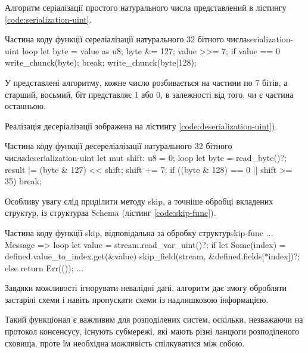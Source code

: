 \documentclass{lib/styles/default-style}
\begin{document}

    Алгоритм серіалізації простого натурального числа представлений в лістингу \ref{code:serialization-uint}.

    \begin{stdout}{Частина коду функції сереліалізації натурального 32 бітного числа}{serialization-uint}
        loop {
            let byte = value as u8;
            byte &= 127;
            value >>= 7;
            if value == 0 {
                write_chunck(byte);
                break;
            }
            write_chunck(byte|128);
        }\end{stdout}

    У представлені алгоритму, кожне число розбивається на частини по 7 бітів, а старший, восьмий, 
    біт представляє 1 або 0, в залежності від того, чи є частина останньою.
    
    Реалізація десеріалізації зображена на лістингу \ref{code:deserialization-uint}).

    \begin{stdout}{Частина коду функції десереліалізації натурального 32 бітного числа}{deserialization-uint}
        let mut shift: u8 = 0;
        loop {
            let byte = read_byte()?;
            result |= (byte & 127) << shift;
            shift += 7;
            if ((byte & 128) == 0 || shift >= 35)
                break;
        }\end{stdout}

    Особливу увагу слід приділити методу skip, а точніше обробці вкладених структур, із структураа Schema (лістинг \ref{code:skip-func}).

    \begin{stdout}{Частина коду функції skip, відповідальна за обробку структур}{skip-func}
        ...
        Message => {
            loop {
              let value = stream.read_var_uint()?;
              if let Some(index) = defined.value_to_index.get(&value)
                skip_field(stream, &defined.fields[*index])?;
              else
                return Err(());
            }
        }
        ...\end{stdout}

    Завдяки можливості ігнорувати невалідні дані, алгоритм дає змогу обробляти застарілі схеми і навіть пропускати схеми із надлишковою інформацією.

    Такий функціонал є важливим для розподілених систем, оскільки, незважаючи на протокол консенсусу,
    існують субмережі, які мають різні ланцюги розподіленого сховища, проте їм необхідна можливість спілкуватися між собою.
\end{document}
